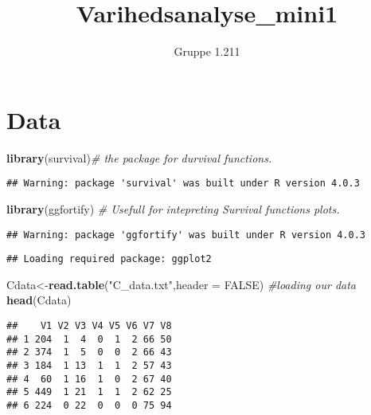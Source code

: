 \documentclass[
]{article}
\title{Varihedsanalyse\_mini1}
\author{Gruppe 1.211}
\date{}
\newenvironment{Shaded}{\begin{snugshade}}{\end{snugshade}}
\newcommand{\CommentTok}[1]{\textcolor[rgb]{0.56,0.35,0.01}{\textit{#1}}}
\newcommand{\DataTypeTok}[1]{\textcolor[rgb]{0.13,0.29,0.53}{#1}}
\newcommand{\KeywordTok}[1]{\textcolor[rgb]{0.13,0.29,0.53}{\textbf{#1}}}
\newcommand{\NormalTok}[1]{#1}
\newcommand{\OtherTok}[1]{\textcolor[rgb]{0.56,0.35,0.01}{#1}}
\newcommand{\StringTok}[1]{\textcolor[rgb]{0.31,0.60,0.02}{#1}}
\begin{document}
\maketitle

\hypertarget{data}{%
\section{Data}\label{data}}

\begin{Shaded}
\begin{Highlighting}[]
\KeywordTok{library}\NormalTok{(survival)}\CommentTok{# the package for durvival functions.}
\end{Highlighting}
\end{Shaded}

\begin{verbatim}
## Warning: package 'survival' was built under R version 4.0.3
\end{verbatim}

\begin{Shaded}
\begin{Highlighting}[]
\KeywordTok{library}\NormalTok{(ggfortify) }\CommentTok{# Usefull for intepreting Survival functions plots.}
\end{Highlighting}
\end{Shaded}

\begin{verbatim}
## Warning: package 'ggfortify' was built under R version 4.0.3
\end{verbatim}

\begin{verbatim}
## Loading required package: ggplot2
\end{verbatim}

\begin{Shaded}
\begin{Highlighting}[]
\NormalTok{Cdata<-}\KeywordTok{read.table}\NormalTok{(}\StringTok{"C_data.txt"}\NormalTok{,}\DataTypeTok{header =} \OtherTok{FALSE}\NormalTok{) }\CommentTok{#loading our data}
\KeywordTok{head}\NormalTok{(Cdata) }
\end{Highlighting}
\end{Shaded}

\begin{verbatim}
##    V1 V2 V3 V4 V5 V6 V7 V8
## 1 204  1  4  0  1  2 66 50
## 2 374  1  5  0  0  2 66 43
## 3 184  1 13  1  1  2 57 43
## 4  60  1 16  1  0  2 67 40
## 5 449  1 21  1  1  2 62 25
## 6 224  0 22  0  0  0 75 94
\end{verbatim}
\end{document}
